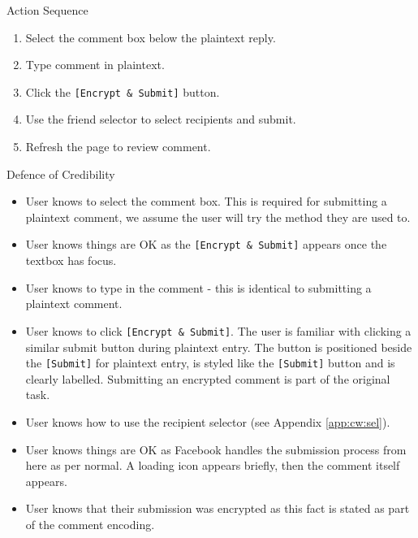 \begin{desc}

    \item[Action Sequence] \hfill
    \begin{enumerate}
        \item Select the comment box below the plaintext reply.
        \item Type comment in plaintext.
        \item Click the {\tt [Encrypt \& Submit]} button.
        \item Use the friend selector to select recipients and submit.
        \item Refresh the page to review comment.
    \end{enumerate}
    
    \item[Defence of Credibility] \hfill
        \begin{itemize}
            
            \item User knows to select the comment box. This is required for submitting a plaintext comment, we assume the user will try the method they are used to.
            
            \item User knows things are OK as the {\tt [Encrypt \& Submit]} appears once the textbox has focus.
            
            \item User knows to type in the comment - this is identical to submitting a plaintext comment.
            
            \item User knows to click {\tt [Encrypt \& Submit]}. The user is familiar with clicking a similar submit button during plaintext entry. The button is positioned beside the {\tt [Submit]} for plaintext entry, is styled like the {\tt [Submit]} button and is clearly labelled. Submitting an encrypted comment is part of the original task.
            
            \item User knows how to use the recipient selector (see Appendix \ref{app:cw:sel}).
            
            \item User knows things are OK as Facebook handles the submission process from here as per normal. A loading icon appears briefly, then the comment itself appears.
            
            \item User knows that their submission was encrypted as this fact is stated as part of the comment encoding.
            

\end{itemize}
\end{desc}
